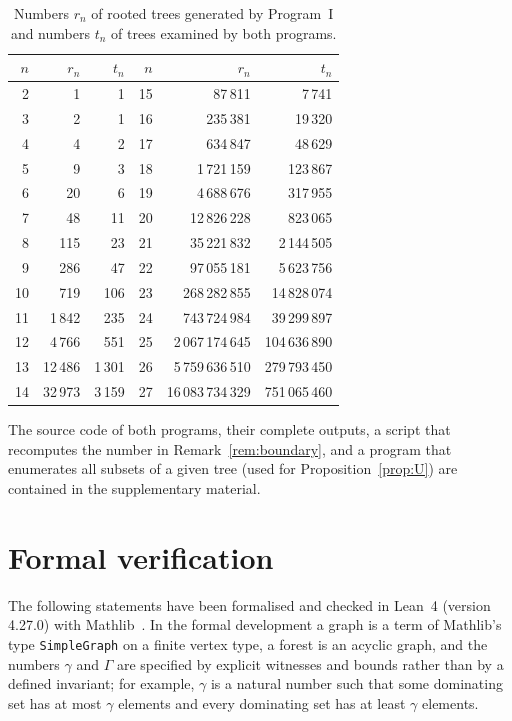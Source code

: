 \documentclass[smallextended,envcountsect,envcountsame]{svjour3}
\begin{document}
\begin{appendices}
\begin{table}[ht]
\centering
\caption{Numbers $r_n$ of rooted trees generated by Program~I and numbers
$t_n$ of trees examined by both programs.}\label{tab:counts}
\smallskip
\begin{tabular}{rrr@{\qquad\qquad}rrr}
\hline
$n$ & $r_n$ & $t_n$ & $n$ & $r_n$ & $t_n$\\
\hline
2 & 1 & 1 & 15 & 87\,811 & 7\,741\\
3 & 2 & 1 & 16 & 235\,381 & 19\,320\\
4 & 4 & 2 & 17 & 634\,847 & 48\,629\\
5 & 9 & 3 & 18 & 1\,721\,159 & 123\,867\\
6 & 20 & 6 & 19 & 4\,688\,676 & 317\,955\\
7 & 48 & 11 & 20 & 12\,826\,228 & 823\,065\\
8 & 115 & 23 & 21 & 35\,221\,832 & 2\,144\,505\\
9 & 286 & 47 & 22 & 97\,055\,181 & 5\,623\,756\\
10 & 719 & 106 & 23 & 268\,282\,855 & 14\,828\,074\\
11 & 1\,842 & 235 & 24 & 743\,724\,984 & 39\,299\,897\\
12 & 4\,766 & 551 & 25 & 2\,067\,174\,645 & 104\,636\,890\\
13 & 12\,486 & 1\,301 & 26 & 5\,759\,636\,510 & 279\,793\,450\\
14 & 32\,973 & 3\,159 & 27 & 16\,083\,734\,329 & 751\,065\,460\\
\hline
\end{tabular}

\end{table}

The source code of both programs, their complete outputs, a script that
recomputes the number in Remark~\ref{rem:boundary}, and a program that
enumerates all subsets of a given tree (used for
Proposition~\ref{prop:U}) are contained in the supplementary material.

\section{Formal verification}\label{app:lean}

The following statements have been formalised and checked in
Lean~4 (version 4.27.0) with Mathlib~\cite{Lean,Mathlib}. In the formal
development a graph is a term of Mathlib's type \texttt{SimpleGraph} on a
finite vertex type, a forest is an acyclic graph, and the numbers $\gamma$
and $\Gamma$ are specified by explicit witnesses and bounds rather than by a
defined invariant; for example, $\gamma$ is a natural number such that some
dominating set has at most $\gamma$ elements and every dominating set has at
least $\gamma$ elements.


\end{appendices}
\end{document}
